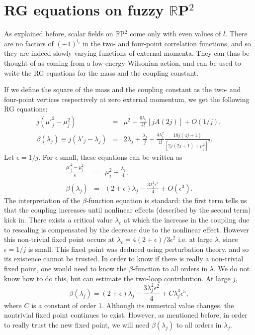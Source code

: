 \documentclass[a4paper,12pt]{article}
\numberwithin{equation}{section}
\begin{document}
\section{RG equations on fuzzy ${\mathbb R}$P$^2$}

As explained before, scalar fields on ${\mathbb R}$P$^2$ come only with
even values of $l$. There are no factors of $(-1)^{l_i}$ in the two-
and four-point correlation functions, and so they are indeed slowly
varying functions of external momenta. They can thus be thought of as
coming from a low-energy Wilsonian action, and can be used to write
the RG equations for the mass and the coupling constant.

If we define the square of the mass and the coupling constant as the
two- and four-point vertices respectively at zero external momentum,
we get the following RG equations:
\begin{eqnarray} 
j({\mu'}_j^2 - \mu_j^2) &=& \mu^2 + \frac{6\lambda_j}{4!} [j A(2j)] +
O(1/j), \\
\beta(\lambda_j) \equiv j (\lambda'_j - \lambda_j) &=& 2 \lambda_j +
\frac{\lambda_j}{j} - \frac{4 \lambda_j^2}{4!} \frac{18
j(4j+1)}{[2j(2j+1)+\mu_j^2]^2}. 
\end{eqnarray}
Let $\epsilon=1/j$. For $\epsilon$ small, these equations can be
written as
\begin{eqnarray}  
\frac{{\mu'}_j^2 - \mu_j^2}{\epsilon}&=& \mu_j^2 + \frac{\lambda_j}{4}, \\
\beta(\lambda_j) &=& (2 + \epsilon) \lambda_j - \frac{3 \lambda_j^2
\epsilon^2}{4} + O(\epsilon^3).  
\end{eqnarray} 
The interpretation of the $\beta$-function equation is standard: the
first term tells us that the coupling increases until nonlinear
effects (described by the second term) kick in. There exists a
critical value $\lambda_c$ at which the increase in the coupling due
to rescaling is compensated by the decrease due to the nonlinear
effect. However this non-trivial fixed point occurs at $\lambda_c =
4(2+ \epsilon)/3\epsilon^2$ i.e. at large $\lambda$, since $\epsilon =
1/j$ is small. This fixed point was deduced using perturbation theory,
and so its existence cannot be trusted. In order to know if there is
really a non-trivial fixed point, one would need to know the
$\beta$-function to all orders in $\lambda$. We do not know how to do
this, but can estimate the two-loop contribution. At large $j$,
\begin{equation} 
\beta(\lambda_j) = (2+\epsilon) \lambda_j - \frac{3 \lambda_j^2
\epsilon^2}{4} + C \lambda_j^3 \epsilon^5, 
\end{equation} 
where $C$ is a constant of order 1. Although its numerical value
changes, the nontrivial fixed point continues to exist. However, as
mentioned before, in order to really trust the new fixed point, we
will need $\beta(\lambda_j)$ to all orders in $\lambda_j$.
\end{document}
